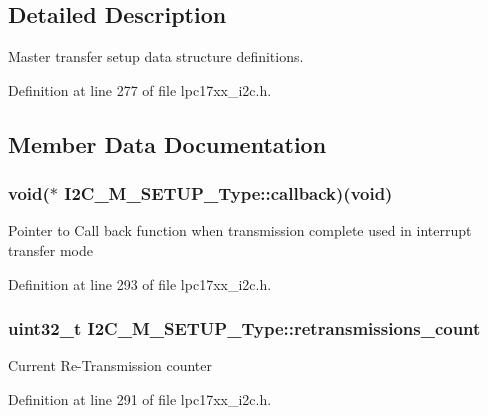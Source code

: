 \subsection{\-Detailed \-Description}
\-Master transfer setup data structure definitions. 

\-Definition at line 277 of file lpc17xx\-\_\-i2c.\-h.



\subsection{\-Member \-Data \-Documentation}
\hypertarget{struct_i2_c___m___s_e_t_u_p___type_a24fc12477badd1015a6150f294883773}{
\subsubsection[{callback}]{\setlength{\rightskip}{0pt plus 5cm}void($\ast$ {\bf \-I2\-C\-\_\-\-M\-\_\-\-S\-E\-T\-U\-P\-\_\-\-Type\-::callback})(void)}}\label{struct_i2_c___m___s_e_t_u_p___type_a24fc12477badd1015a6150f294883773}
\-Pointer to \-Call back function when transmission complete used in interrupt transfer mode 

\-Definition at line 293 of file lpc17xx\-\_\-i2c.\-h.

\hypertarget{struct_i2_c___m___s_e_t_u_p___type_aa6840f872e22a72e9f916a490ecd1248}{
\subsubsection[{retransmissions\-\_\-count}]{\setlength{\rightskip}{0pt plus 5cm}uint32\-\_\-t {\bf \-I2\-C\-\_\-\-M\-\_\-\-S\-E\-T\-U\-P\-\_\-\-Type\-::retransmissions\-\_\-count}}}\label{struct_i2_c___m___s_e_t_u_p___type_aa6840f872e22a72e9f916a490ecd1248}
\-Current \-Re-\/\-Transmission counter 

\-Definition at line 291 of file lpc17xx\-\_\-i2c.\-h.

